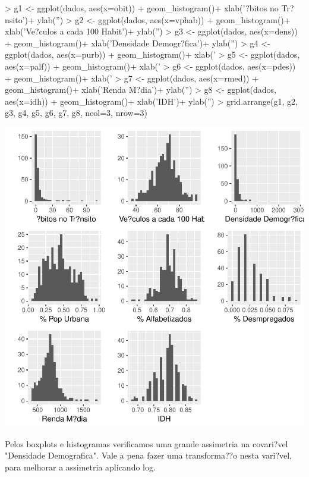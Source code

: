 \documentclass[a4paper]{article} %
\begin{document}
\begin{Schunk}
\begin{Sinput}
> g1 <- ggplot(dados, aes(x=obit)) + geom_histogram()+ xlab('?bitos no Tr?nsito')+ ylab('')
> g2 <- ggplot(dados, aes(x=vphab)) + geom_histogram()+ xlab('Ve?culos a cada 100 Habit')+ ylab('')
> g3 <- ggplot(dados, aes(x=dens)) + geom_histogram()+ xlab('Densidade Demogr?fica')+ ylab('')
> g4 <- ggplot(dados, aes(x=purb)) + geom_histogram()+ xlab('%
> g5 <- ggplot(dados, aes(x=palf)) + geom_histogram()+ xlab('%
> g6 <- ggplot(dados, aes(x=pdes)) + geom_histogram()+ xlab('%
> g7 <- ggplot(dados, aes(x=rmed)) + geom_histogram()+ xlab('Renda M?dia')+ ylab('')
> g8 <- ggplot(dados, aes(x=idh)) + geom_histogram()+ xlab('IDH')+ ylab('')
> grid.arrange(g1, g2, g3, g4, g5, g6, g7, g8, ncol=3, nrow=3)
\end{Sinput}
\end{Schunk}
\includegraphics{count1-004}


Pelos boxplots e histogramas verificamos uma grande assimetria na covari?vel "Densidade Demografica". Vale a pena fazer uma transforma??o nesta vari?vel, para melhorar a assimetria aplicando log.
\end{document}
